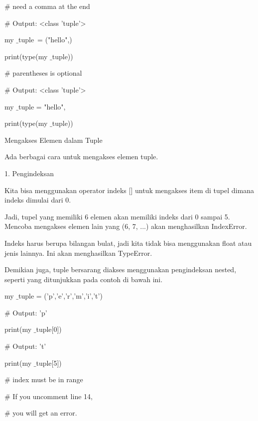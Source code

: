  $  \#  $ need a comma at the end \par
 $  \#  $ Output: <class 'tuple'> \par
my $  \_  $tuple~= ("hello",)   \par
print(type(my $  \_  $tuple)) \par
\vspace{12pt}
 $  \#  $ parentheses is optional \par
 $  \#  $ Output: <class 'tuple'> \par
my $  \_  $tuple = "hello", \par
print(type(my $  \_  $tuple)) \par
\vspace{12pt}
Mengakses Elemen dalam Tuple \par
\vspace{12pt}
Ada berbagai cara untuk mengakses elemen tuple. \par
1. Pengindeksan \par
\vspace{12pt}
Kita bisa menggunakan operator indeks [] untuk mengakses item di tupel dimana indeks dimulai dari 0. \par
\vspace{12pt}
Jadi, tupel yang memiliki 6 elemen akan memiliki indeks dari 0 sampai 5. Mencoba mengakses elemen lain yang (6, 7, ...) akan menghasilkan IndexError. \par
\vspace{12pt}
Indeks harus berupa bilangan bulat, jadi kita tidak bisa menggunakan float atau jenis lainnya. Ini akan menghasilkan TypeError. \par
\vspace{12pt}
Demikian juga, tuple bersarang diakses menggunakan pengindeksan nested, seperti yang ditunjukkan pada contoh di bawah ini. \par
my $  \_  $tuple = ('p','e','r','m','i','t') \par
\vspace{12pt}
 $  \#  $ Output: 'p' \par
print(my $  \_  $tuple[0]) \par
\vspace{12pt}
 $  \#  $ Output: 't' \par
print(my $  \_  $tuple[5]) \par
\vspace{12pt}
 $  \#  $ index must be in range \par
 $  \#  $ If you uncomment line 14, \par
 $  \#  $ you will get an error. \par
